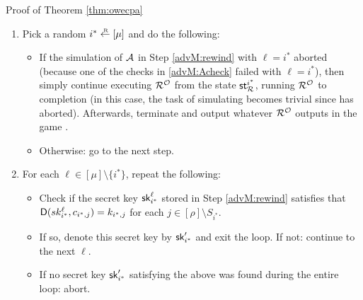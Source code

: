 \begin{namedproof}{Proof of Theorem \ref{thm:owecpa}}
\begin{enumerate}[itemsep=0.1cm]
\begin{itemize}[label={\textbullet},itemsep=0.1cm]
\begin{enumerate}[topsep=0.1cm,itemsep=0.1cm,ref=(\alph*)]
                          storing the resulting secret keys as \((\sk_{i}^{\ell})_{i \in [\mu] \setminus \{\ell\}}\).
                    \item\label{advM:Acheck} For each \(i \ne \ell\),
                          aborting the simulation of \advA if
                          \(\Decaps(\sk_{i}^{\ell},c_{i,j}) \ne k_{i,j}\) for some \(j \in [\rho] \setminus S_{i}\).
                  \end{enumerate}
            \item Denote the state of \(\redR^{\oracle}\) after this point by \(\state_{\redR}^{\ell}\).
          \end{itemize}
    \item\label{advM:sample} Pick a random \(i^{*} \sampleR [\mu]\) and do the following:
        \begin{itemize}[label={\textbullet},itemsep=0.1cm]
          \item If the simulation of \(\mathcal{A}\) in Step \ref{advM:rewind} with \(\ell = i^{*}\)
                aborted (because one of the checks in \ref{advM:Acheck} failed with \(\ell = i^{*}\)),
                then simply continue executing \(\redR^{\oracle}\)
                from the state \(\state_{\redR}^{i^{*}}\), running \(\redR^{\oracle}\) to completion
                (in this case, the task of simulating \advA becomes trivial since \advA has aborted).
                Afterwards, terminate and output whatever \(\redR^{\oracle}\) outputs in the game \SICA.
          \item Otherwise: go to the next step.
        \end{itemize}
    \item\label{advM:key} For each \(\ell \in [\mu] \setminus \{i^{*}\}\), repeat the following:
          \begin{itemize}[label={\textbullet},itemsep=0.1cm]
            \item Check if the secret key \(\mathsf{sk}_{i^{*}}^{\ell}\)
                  stored in Step \ref{advM:rewind} satisfies that
                  \(\mathsf{D}(sk_{i^{*}}^{\ell},c_{i^{*},j}) = k_{i^{*},j}\)
                  for each \(j \in [\rho] \setminus S_{i^{*}}\).
            \item If so, denote this secret key by \(\mathsf{sk}_{i^{*}}'\) and exit the loop.
                  If not: continue to the next \(\ell\).
            \item If no secret key \(\mathsf{sk}_{i^{*}}'\) satisfying the above
                  was found during the entire loop: abort.
          \end{itemize}

\end{enumerate}
\end{namedproof}
